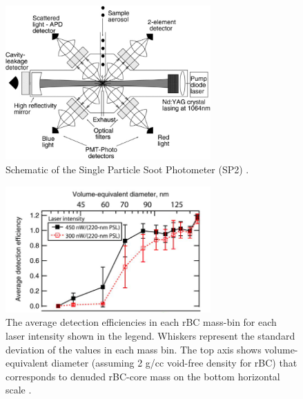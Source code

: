 \documentclass[12pt, fullpage]{uiucthesis2009_2}
\begin{document}
	\begin{figure}[h] 
		\begin{center}
			\includegraphics[width = 0.7\textwidth]{Figure09}
			\caption[Schematic of the Single Particle Soot Photometer (SP2) \citep{schwarz2010global}.]{\label{fig_P9} Schematic of the Single Particle Soot Photometer (SP2) \citep{schwarz2010global}.}
		\end{center}
	\end{figure}
	
	\begin{figure}[h] 
		\begin{center}
			\includegraphics[width = 0.7\textwidth]{Figure08}
			\caption[The average detection efficiencies in each rBC mass-bin for each laser intensity shown in the legend. Whiskers represent the standard deviation of the values in each mass bin. The top axis shows volume-equivalent diameter (assuming 2 g/cc void-free density for rBC) that corresponds to denuded rBC-core mass on the bottom horizontal scale \citep{schwarz2010global}]{\label{fig_P8} The average detection efficiencies in each rBC mass-bin for each laser intensity shown in the legend. Whiskers represent the standard deviation of the values in each mass bin. The top axis shows volume-equivalent diameter (assuming 2 g/cc void-free density for rBC) that corresponds to denuded rBC-core mass on the bottom horizontal scale \citep{schwarz2010global}.}
		\end{center}
	\end{figure}
\end{document}
